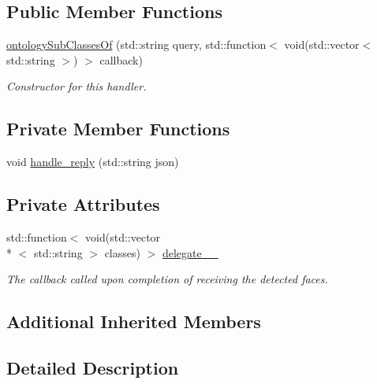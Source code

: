 \subsection*{Public Member Functions}
\begin{DoxyCompactItemize}
\item 
\hyperlink{classrapp_1_1cloud_1_1ontologySubClassesOf_a2da927fee24f214627ab82532d772cd4}{ontology\-Sub\-Classes\-Of} (std\-::string query, std\-::function$<$ void(std\-::vector$<$ std\-::string $>$) $>$ callback)
\begin{DoxyCompactList}\small\item\em Constructor for this handler. \end{DoxyCompactList}\end{DoxyCompactItemize}
\subsection*{Private Member Functions}
\begin{DoxyCompactItemize}
\item 
void \hyperlink{classrapp_1_1cloud_1_1ontologySubClassesOf_addae350460d397612af1101f7b2baee9}{handle\-\_\-reply} (std\-::string json)
\end{DoxyCompactItemize}
\subsection*{Private Attributes}
\begin{DoxyCompactItemize}
\item 
std\-::function$<$ void(std\-::vector\\*
$<$ std\-::string $>$ classes) $>$ \hyperlink{classrapp_1_1cloud_1_1ontologySubClassesOf_a5f4e4ad83ac61ccd91871f1c3d4147b8}{delegate\-\_\-\-\_\-}
\begin{DoxyCompactList}\small\item\em The callback called upon completion of receiving the detected faces. \end{DoxyCompactList}\end{DoxyCompactItemize}
\subsection*{Additional Inherited Members}


\subsection{Detailed Description}


